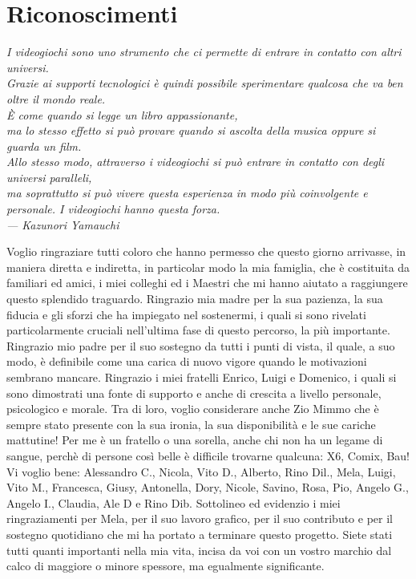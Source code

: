 

\chapter*{Riconoscimenti}

\begin{flushright}
\itshape
I videogiochi sono uno strumento che ci permette di entrare in contatto con altri universi. \\
Grazie ai supporti tecnologici è quindi possibile sperimentare qualcosa che va ben oltre il mondo reale. \\
È come quando si legge un libro appassionante, \\
ma lo stesso effetto si può provare quando si ascolta della musica oppure si guarda un film. \\
Allo stesso modo, attraverso i videogiochi si può entrare in contatto con degli universi paralleli, \\
ma soprattutto si può vivere questa esperienza in modo più coinvolgente e personale.
I videogiochi hanno questa forza. \\


\medskip
--- Kazunori Yamauchi

\end{flushright}

\bigskip
\bigskip

Voglio ringraziare tutti coloro che hanno permesso che questo giorno arrivasse, in maniera diretta e indiretta, in particolar
modo la mia famiglia, che è costituita da familiari ed amici, i miei colleghi ed i Maestri che mi hanno aiutato a raggiungere questo splendido traguardo.
Ringrazio mia madre per la sua pazienza, la sua fiducia e gli sforzi che ha impiegato nel sostenermi, i quali si sono rivelati particolarmente
cruciali nell'ultima fase di questo percorso, la più importante. Ringrazio mio padre per il suo sostegno da tutti i punti di vista, il quale,
a suo modo, è definibile come una carica di nuovo vigore quando le motivazioni sembrano mancare.
Ringrazio i miei fratelli Enrico, Luigi e Domenico, i quali si sono dimostrati una fonte di supporto e anche di crescita a livello personale, psicologico e morale. Tra di loro,
voglio considerare anche Zio Mimmo che è sempre stato presente con la sua ironia, la sua disponibilità e le sue cariche mattutine!
Per me è un fratello o una sorella, anche chi non ha un legame di sangue, perchè di persone così belle è difficile trovarne qualcuna: X6, Comix, Bau!
Vi voglio bene: Alessandro C., Nicola, Vito D., Alberto, Rino Dil., Mela, Luigi, Vito M., Francesca, Giusy, Antonella, Dory, Nicole, Savino, Rosa, Pio, Angelo G., Angelo I., Claudia, Ale D e Rino Dib.
Sottolineo ed evidenzio i miei ringraziamenti per Mela, per il suo lavoro grafico, per il suo contributo e per il sostegno quotidiano che mi ha portato a terminare questo progetto.
Siete stati tutti quanti importanti nella mia vita, incisa da voi con un vostro marchio dal calco di maggiore o minore spessore, ma egualmente significante.%
